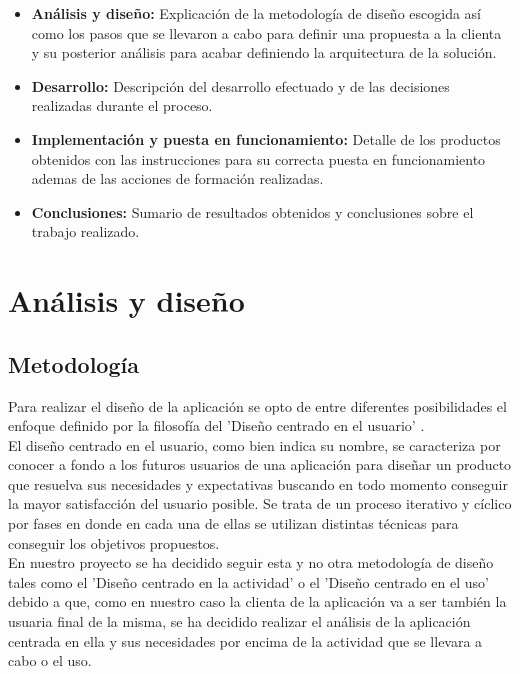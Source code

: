 \documentclass[11pt,a4paper]{article}
\begin{document}
\begin{itemize}
\item \textbf{Análisis y diseño:} Explicación de la metodología de diseño escogida así como los pasos que se llevaron a cabo para definir una propuesta a la clienta y su posterior análisis para acabar definiendo la arquitectura de la solución.
\item \textbf{Desarrollo:} Descripción del desarrollo efectuado y de las decisiones realizadas durante el proceso.
\item \textbf{Implementación y puesta en funcionamiento:} Detalle de los productos obtenidos con las instrucciones para su correcta puesta en funcionamiento ademas de las acciones de formación realizadas.
\item \textbf{Conclusiones:} Sumario de resultados obtenidos y conclusiones sobre el trabajo realizado.
\end{itemize}

\newpage 



\section{Análisis y diseño}
\bigskip 

\subsection{Metodología}\label{metodologia} 
Para realizar el diseño de la aplicación se opto de entre diferentes posibilidades el enfoque definido por la filosofía del 'Diseño centrado en el usuario' \cite{15}.
\\

El diseño centrado en el usuario, como bien indica su nombre, se caracteriza por conocer a fondo a los futuros usuarios de una aplicación para diseñar un producto que resuelva sus necesidades y expectativas buscando en todo momento conseguir la mayor satisfacción del usuario posible. Se trata de un proceso iterativo y cíclico por fases en donde en cada una de ellas se utilizan distintas técnicas para conseguir los objetivos propuestos. 
\\

En nuestro proyecto se ha decidido seguir esta y no otra metodología de diseño tales como el 'Diseño centrado en la actividad' o el 'Diseño centrado en el uso' debido a que, como en nuestro caso la clienta de la aplicación va a ser también la usuaria final de la misma, se ha decidido realizar el análisis de la aplicación centrada en ella y sus necesidades por encima de la actividad que se llevara a cabo o el uso.
\\
\end{document}

